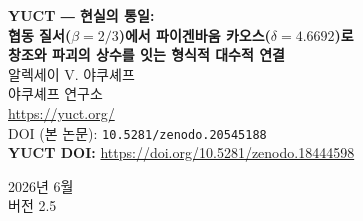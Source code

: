 \documentclass[11pt,a4paper]{article}
\begin{document}
	
	\begin{titlepage}
		\centering
		\vspace*{2cm}
		
		{\Huge\bfseries YUCT ― 현실의 통일:\\[0.3cm]
			협동 질서(\(\beta = 2/3\))에서 파이겐바움 카오스(\(\delta = 4.6692\))로}\\[1cm]
		
		{\Large\bfseries 창조와 파괴의 상수를 잇는 형식적 대수적 연결}\\[2cm]
		
		{\large 알렉세이 V. 야쿠셰프}\\[0.5cm]
		{\normalsize 야쿠셰프 연구소}\\[0.3cm]
		{\normalsize \url{https://yuct.org/}}\\[1.5cm]
		
		{\normalsize DOI (본 논문): \texttt{10.5281/zenodo.20545188}}\\
		\vspace*{1cm}
		\textbf{YUCT DOI:} \url{https://doi.org/10.5281/zenodo.18444598}\\
		\vspace*{1cm}
		
		{\normalsize 2026년 6월}\\[0.3cm]
		{\normalsize 버전 2.5}\\[2cm]
	\end{titlepage}
	
\end{document}

